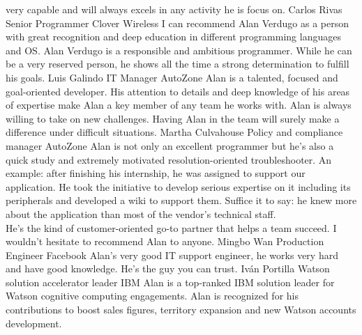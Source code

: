 \begin{referees}
{        very capable and will always excels in any activity he is focus on.}
        {Carlos Rivas}
        {Senior Programmer}
        {Clover Wireless}
        {I can recommend Alan Verdugo as a person with great recognition and 
        deep education in different programming languages and OS. Alan Verdugo 
        is a responsible and ambitious programmer. While he can be a very 
        reserved person, he shows all the time a strong determination to 
        fulfill his goals.}
        {Luis Galindo}
        {IT Manager}
        {AutoZone}
        {Alan is a talented, focused and goal-oriented developer. His attention 
        to details and deep knowledge of his areas of expertise make Alan a key 
        member of any team he works with. Alan is always willing to take on new 
        challenges. Having Alan in the team will surely make a difference under 
        difficult situations.}
        {Martha Culvahouse}
        {Policy and compliance manager}
        {AutoZone}
        {Alan is not only an excellent programmer but he's also a quick study 
        and extremely motivated resolution-oriented troubleshooter. An example: 
        after finishing his internship, he was assigned to support our 
        application. He took the initiative to develop serious expertise on it 
        including its peripherals and developed a wiki to support them. Suffice 
        it to say: he knew more about the application than most of the vendor's 
        technical staff.\\He's the kind of customer-oriented go-to partner that 
        helps a team succeed. I wouldn't hesitate to recommend Alan to anyone.}
        {Mingbo Wan}
        {Production Engineer}
        {Facebook}
        {Alan's very good IT support engineer, he works very hard and have good 
        knowledge. He's the guy you can trust.}
        {Iván Portilla}
        {Watson solution accelerator leader}
        {IBM}
        {Alan is a top-ranked IBM solution leader for Watson cognitive 
        computing engagements. Alan is recognized for his contributions to 
        boost sales figures, territory expansion and new Watson accounts 
        development.}

\end{referees}